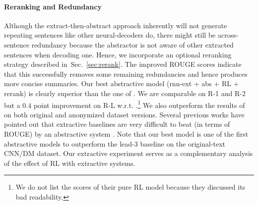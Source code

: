 \documentclass[11pt,a4paper]{article}
\def\secref#1{Sec.~\ref{#1}}
\begin{document}
\paragraph{Reranking and Redundancy}
\label{sec:rerank-exp}
Although the extract-then-abstract approach inherently will not generate repeating sentences like other neural-decoders do, there might still be across-sentence redundancy because the abstractor is not aware of other extracted sentences when decoding one.
Hence, we incorporate an optional reranking strategy described in~\secref{sec:rerank}.
The improved ROUGE scores indicate that this successfully removes some remaining redundancies and hence produces more concise summaries.
Our best abstractive model (rnn-ext + abs + RL + rerank) is clearly superior than the one of \citet{get_to_the_point}.
We are comparable on R-1 and R-2 but a 0.4 point improvement on R-L w.r.t. \citet{DBLP:journals/corr/PaulusXS17}.\footnote{We do not list the scores of their pure RL model because they discussed its bad readability.} We also outperform the results of~\citet{control-summ} on both original and anonymized dataset versions.
Several previous works have pointed out that extractive baselines are very difficult to beat (in terms of ROUGE) by an abstractive system \citep{get_to_the_point,AAAI17:summarunner}. Note that our best model is one of the first abstractive models to outperform the lead-3 baseline on the original-text CNN/DM dataset. 
Our extractive experiment serves as a complementary analysis of the effect of RL with extractive systems.



\begin{table}[t]
\centering
{}
\vspace{-12pt}
\caption{
Human Evaluation: pairwise comparison between our final model and~.
}
\vspace{-10pt}
\label{tab:human_eval}
\end{table}
\end{document}
